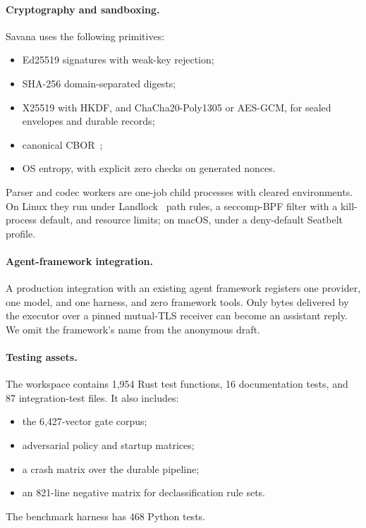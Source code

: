 \documentclass[letterpaper,twocolumn,10pt]{article}
\newcommand{\sys}{Savana}
\newcommand{\code}[1]{\texttt{\detokenize{#1}}}
\begin{document}
\paragraph{Cryptography and sandboxing.} \sys{} uses the following
primitives:
\begin{itemize}
\item Ed25519 signatures with weak-key rejection;
\item SHA-256 domain-separated digests;
\item X25519 with HKDF, and ChaCha20-Poly1305 or AES-GCM, for sealed
  envelopes and durable records;
\item canonical CBOR~\cite{rfc8949};
\item OS entropy, with explicit zero checks on generated nonces.
\end{itemize}
Parser and codec workers are one-job child processes with cleared
environments. On Linux they run under Landlock~\cite{landlock} path rules,
a seccomp-BPF filter with a kill-process default, and resource limits; on
macOS, under a deny-default Seatbelt profile.

\paragraph{Agent-framework integration.} A production integration with an
existing agent framework registers one provider, one model, and one
harness, and zero framework tools. Only bytes delivered by the executor
over a pinned mutual-TLS receiver can become an assistant reply. We omit
the framework's name from the anonymous draft.

\paragraph{Testing assets.} The workspace contains 1{,}954 Rust test
functions, 16 \code{compile_fail} documentation tests, and 87
integration-test files. It also includes:
\begin{itemize}
\item the 6{,}427-vector gate corpus;
\item adversarial policy and startup matrices;
\item a crash matrix over the durable pipeline;
\item an 821-line negative matrix for declassification rule sets.
\end{itemize}
The benchmark harness has 468 Python tests.

\end{document}
